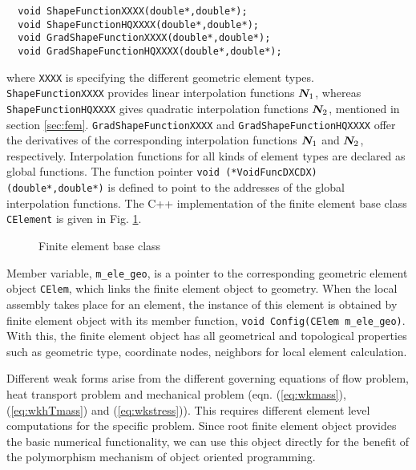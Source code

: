 \begin{verbatim}
  void ShapeFunctionXXXX(double*,double*);
  void ShapeFunctionHQXXXX(double*,double*);
  void GradShapeFunctionXXXX(double*,double*);
  void GradShapeFunctionHQXXXX(double*,double*);
\end{verbatim}

where \texttt{XXXX} is specifying the different geometric element
types. \texttt{ShapeFunction\-XXXX} provides linear interpolation
functions $\bm N_1$, whereas \texttt{ShapeFunctionHQXXXX} gives
quadratic interpolation functions $\bm N_2$, mentioned in section
\ref{sec:fem}. \texttt{GradShape\-FunctionXXXX} and
\texttt{GradShapeFunctionHQXXXX} offer the derivatives of the
corresponding interpolation functions $\bm N_1$ and $\bm N_2$,
respectively. Interpolation functions for all kinds of element types are declared as global functions. 
The function pointer 
\texttt{void (*VoidFuncDXCDX) (double*,double*)}
is defined to point to the addresses of the global interpolation 
functions. 
 The C++ implementation of the finite element base class \texttt{CElement} is 
given in Fig. \ref{fig:fem_root}.

\begin{figure}[htb!]
\centering
\shadowbox{
\begin{minipage}{\textwidth}

\end{minipage}
}
\caption{Finite element base class}
\label{fig:fem_root}
\end{figure}

Member variable, \texttt{m\_ele\_geo}, is a pointer to the
corresponding geometric element object \texttt{CElem}, which links
the finite element object to geometry. When the local assembly
takes place for an element, the instance of this element is
obtained by finite element object with its member function,
\texttt{void Config(CElem\* m\_ele\_geo)}. With this, the finite
element object has all geometrical and topological properties such as geometric type,
coordinate nodes, neighbors for local element calculation.

%
%

Different weak forms arise from the different governing equations
of flow problem, heat transport problem and mechanical problem
(eqn. (\ref{eq:wkmass}), (\ref{eq:wkhTmass}) and
(\ref{eq:wkstress})). This requires different element level
computations for the specific problem. Since root finite element
object provides the basic numerical functionality, we can use 
this object directly for the benefit of the polymorphism mechanism
of object oriented programming.

